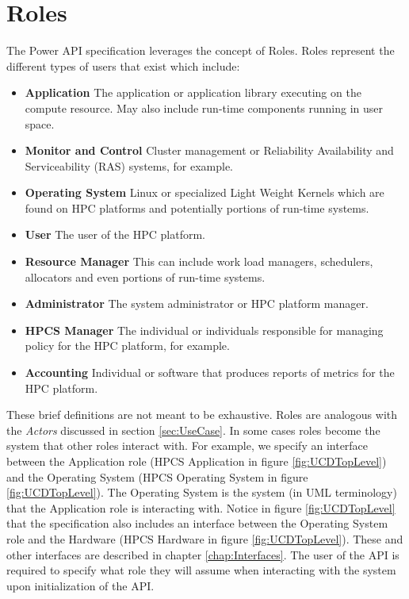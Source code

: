 \documentclass[12pt]{report} %
\begin{document}
\section{Roles}\label{sec:Roles}

The Power API specification leverages the concept of Roles. 
Roles represent the different types of users that exist which include:
\begin{itemize}[noitemsep,nolistsep] %
\item{\textbf{Application}  The application or application library executing on the compute resource. May also include run-time components running in user space.}
\item{\textbf{Monitor and Control}  Cluster management or Reliability Availability and Serviceability (RAS) systems, for example.}
\item{\textbf{Operating System} Linux or specialized Light Weight Kernels which are found on HPC platforms and potentially portions of run-time systems. }
\item{\textbf{User} The user of the HPC platform. }
\item{\textbf{Resource Manager} This can include work load managers, schedulers, allocators and even portions of run-time systems. }
\item{\textbf{Administrator} The system administrator or HPC platform manager. }
\item{\textbf{HPCS Manager} The individual or individuals responsible for managing policy for the HPC platform, for example. }
\item{\textbf{Accounting} Individual or software that produces reports of metrics for the HPC platform. }
\end{itemize}
These brief definitions are not meant to be exhaustive.
Roles are analogous with the \textit{Actors} discussed in section \ref{sec:UseCase}.
In some cases roles become the system that other roles interact with.
For example, we specify an interface between the Application role (HPCS Application in figure \ref{fig:UCDTopLevel}) and the Operating System (HPCS Operating System in figure \ref{fig:UCDTopLevel}).
The Operating System is the system (in UML terminology) that the Application role is interacting with. 
Notice in figure \ref{fig:UCDTopLevel} that the specification also includes an interface between the Operating System role and the Hardware (HPCS Hardware in figure \ref{fig:UCDTopLevel}).
These and other interfaces are described in chapter \ref{chap:Interfaces}.
The user of the API is required to specify what role they will assume when interacting with the system upon initialization of the API.
\end{document}
